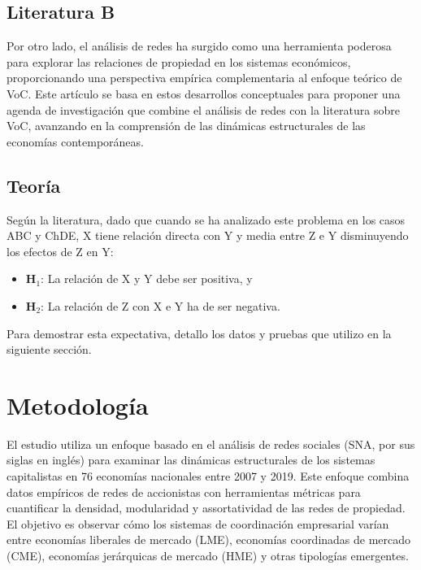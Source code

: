 \documentclass[12pt]{article}
\begin{document}
\lipsum

\subsection{Literatura B}

Por otro lado, el análisis de redes ha surgido como una herramienta poderosa para explorar las relaciones de propiedad en los sistemas económicos, proporcionando una perspectiva empírica complementaria al enfoque teórico de VoC. Este artículo se basa en estos desarrollos conceptuales para proponer una agenda de investigación que combine el análisis de redes con la literatura sobre VoC, avanzando en la comprensión de las dinámicas estructurales de las economías contemporáneas.

\lipsum

\subsection{Teoría}

\lipsum[2]

Según la literatura, dado que cuando se ha analizado este problema en los casos ABC y ChDE, X tiene relación directa con Y y media entre Z e Y disminuyendo los efectos de Z en Y:
\begin{itemize}
    \item \textbf{H$_1$}: La relación de X y Y debe ser positiva, y
    \item \textbf{H$_2$}: La relación de Z con X e Y ha de ser negativa.
\end{itemize}

Para demostrar esta expectativa, detallo los datos y pruebas que utilizo en la siguiente sección.

\section{Metodología}
El estudio utiliza un enfoque basado en el análisis de redes sociales (SNA, por sus siglas en inglés) para examinar las dinámicas estructurales de los sistemas capitalistas en 76 economías nacionales entre 2007 y 2019. Este enfoque combina datos empíricos de redes de accionistas con herramientas métricas para cuantificar la densidad, modularidad y assortatividad de las redes de propiedad. El objetivo es observar cómo los sistemas de coordinación empresarial varían entre economías liberales de mercado (LME), economías coordinadas de mercado (CME), economías jerárquicas de mercado (HME) y otras tipologías emergentes.
\end{document}
